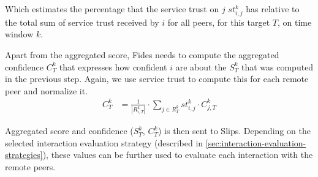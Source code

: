 Which estimates the percentage that the service trust on $j$ $st^{k}_{i, j}$ has relative to the total sum of service trust received by $i$ for all peers, for this target $T$, on time window $k$.

Apart from the aggregated score, Fides needs to compute the aggregated confidence $C^{k}_{T}$ that expresses how confident $i$ are about the $S^{k}_{T}$ that was computed in the previous step.
Again, we use service trust to compute this for each remote peer and normalize it. 
\begin{equation}
\begin{split}
    C^{k}_{T} &= \frac{1}{|R^{k}_{i, T}|} \cdot \sum_{{j}\in R^{k}_{T}} st^{k}_{i, j} \cdot C^{k}_{j, T}
\end{split}
\end{equation}

\noindent 
Aggregated score and confidence ($S^{k}_{T}$, $C^{k}_{T}$) is then sent to Slips.
Depending on the selected interaction evaluation strategy (described in \ref{sec:interaction-evaluation-strategies}), these values can be further used to evaluate each interaction with the remote peers.